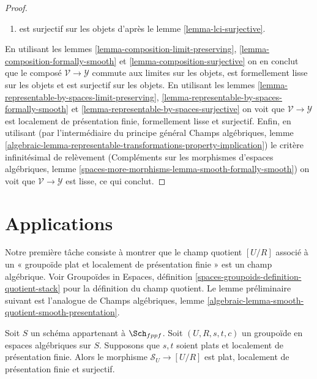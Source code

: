 \begin{proof}
\begin{enumerate}
\item est surjectif sur les objets d'après le
lemme \ref{lemma-lci-surjective}.
\end{enumerate}
En utilisant les
lemmes \ref{lemma-composition-limit-preserving},
\ref{lemma-composition-formally-smooth} et
\ref{lemma-composition-surjective}
on en conclut que le composé $\mathcal{V} \to \mathcal{Y}$
commute aux limites sur les objets, est formellement lisse sur les objets et
est surjectif sur les objets.
En utilisant les
lemmes \ref{lemma-representable-by-spaces-limit-preserving},
\ref{lemma-representable-by-spaces-formally-smooth} et
\ref{lemma-representable-by-spaces-surjective}
on voit que $\mathcal{V} \to \mathcal{Y}$ est
localement de présentation finie, formellement lisse et surjectif.
Enfin, en utilisant (par l'intermédiaire du principe général
Champs algébriques,
lemme \ref{algebraic-lemma-representable-transformations-property-implication})
le critère infinitésimal de relèvement
(Compléments sur les morphismes d'espaces algébriques, lemme
\ref{spaces-more-morphisms-lemma-smooth-formally-smooth})
on voit que $\mathcal{V} \to \mathcal{Y}$ est lisse, ce qui conclut.
\end{proof}








\section{Applications}
\label{section-applications}

\noindent
Notre première tâche consiste à montrer que le champ quotient $[U/R]$ associé à
un « groupoïde plat et localement de présentation finie » est un champ algébrique.
Voir
Groupoïdes in Espaces,
définition \ref{spaces-groupoids-definition-quotient-stack}
pour la définition du champ quotient.
Le lemme préliminaire suivant est l'analogue de
Champs algébriques,
lemme \ref{algebraic-lemma-smooth-quotient-smooth-presentation}.

\begin{lemma}
\label{lemma-flat-quotient-flat-presentation}
Soit $S$ un schéma appartenant à $\Sch_{fppf}$.
Soit $(U, R, s, t, c)$ un groupoïde en espaces algébriques sur $S$.
Supposons que $s, t$ soient plats et localement de présentation finie.
Alors le morphisme $\mathcal{S}_U \to [U/R]$ est plat, localement de
présentation finie et surjectif.
\end{lemma}

